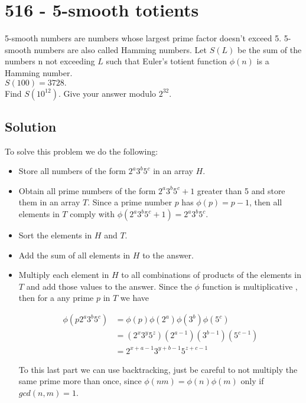 \chapter*{516 - 5-smooth totients}

5-smooth numbers are numbers whose largest prime factor doesn't exceed 5.
5-smooth numbers are also called Hamming numbers.
Let $S(L)$ be the sum of the numbers n not exceeding $L$ such that Euler's totient function $\phi(n)$ is a Hamming number.\\

$S(100)=3728.$\\

Find $S(10^{12})$. Give your answer modulo $2^{32}$.

\section*{Solution}

To solve this problem we do the following:

\begin{itemize}
    \item Store all numbers of the form $2^a 3^b 5^c$ in an array $H$.
    \item Obtain all prime numbers of the form $2^a 3^b 5^c + 1$ greater than 5 and store them in an array $T$. Since a prime number $p$ has $\phi(p) = p-1$, then all elements in $T$ comply with $\phi(2^a 3^b 5^c + 1) = 2^a 3^b 5^c$.
    \item Sort the elements in $H$ and $T$.
    \item Add the sum of all elements in $H$ to the answer.
    \item Multiply each element in $H$ to all combinations of products of the elements in $T$ and add those values to the answer. Since the $\phi$ function is multiplicative , then for a any prime $p$ in $T$ we have 
    
    \begin{align*}
        \phi(p 2^a 3^b 5^c) &= \phi(p) \phi(2^a) \phi(3^b) \phi(5^c) \\
        &= (2^x 3^y 5^z) (2^{a-1}) (3^{b-1}) (5^{c-1}) \\
        &= 2^{x+a-1} 3^{y+b-1} 5^{z+c-1}
    \end{align*}
    
    To this last part we can use backtracking, just be careful to not multiply the same prime more than once, since $\phi(nm) = \phi(n)\phi(m)$ only if $gcd(n,m) = 1$.
    
\end{itemize}

